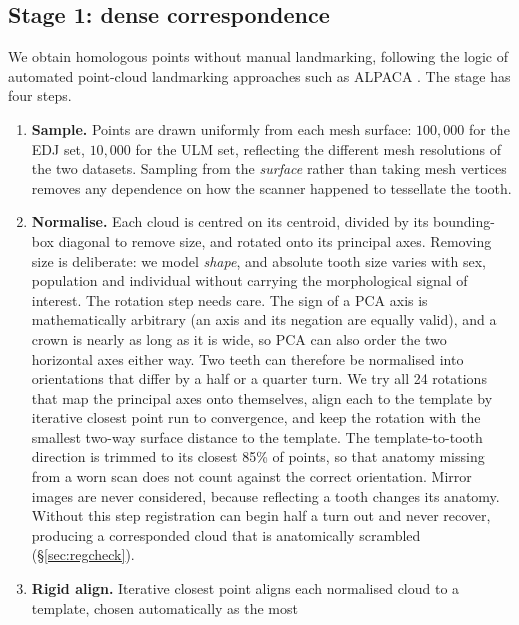 \documentclass[10pt,a4paper,twocolumn]{article}
\begin{document}
\subsection{Stage 1: dense correspondence}
\label{sec:corr}

We obtain homologous points without manual landmarking, following the logic of
automated point-cloud landmarking approaches such as ALPACA
\citep{porto2021alpaca}. The stage has four steps.

\begin{enumerate}
  \item \textbf{Sample.} Points are drawn uniformly from each mesh surface:
        $100{,}000$ for the EDJ set, $10{,}000$ for the ULM set, reflecting the
        different mesh resolutions of the two datasets. Sampling from the
        \emph{surface} rather than taking mesh vertices removes any dependence on
        how the scanner happened to tessellate the tooth.
  \item \textbf{Normalise.} Each cloud is centred on its centroid, divided by its
        bounding-box diagonal to remove size, and rotated onto its principal
        axes. Removing size is deliberate: we model \emph{shape}, and absolute
        tooth size varies with sex, population and individual without carrying
        the morphological signal of interest. The rotation step needs care.
        The sign of a PCA axis is mathematically arbitrary (an axis and its
        negation are equally valid), and a crown is nearly as long as it is
        wide, so PCA can also order the two horizontal axes either way. Two teeth
        can therefore be normalised into orientations that differ by a half or a
        quarter turn. We try all 24 rotations that map the principal axes onto
        themselves, align each to the template by iterative closest point run
        to convergence, and keep the rotation with the smallest two-way surface
        distance to the template. The template-to-tooth direction is trimmed to
        its closest 85\% of points, so that anatomy missing from a worn scan does
        not count against the correct orientation. Mirror images are never
        considered, because reflecting a tooth changes its anatomy. Without this
        step registration can begin half a turn out and never recover, producing
        a corresponded cloud that is anatomically scrambled
        (\S\ref{sec:regcheck}).
  \item \textbf{Rigid align.} Iterative closest point \citep{besl1992icp} aligns
        each normalised cloud to a template, chosen automatically as the most

\end{enumerate}
\end{document}
